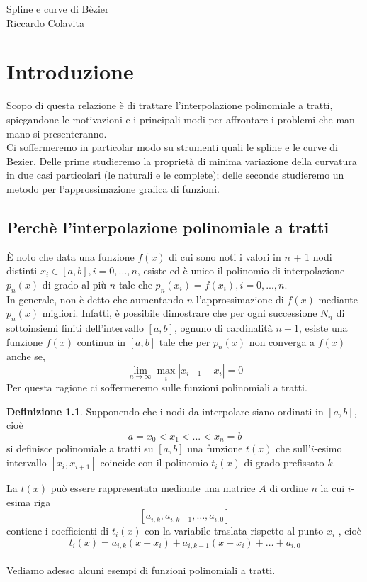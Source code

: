 \documentclass[a4paper,12pt]{report}
\theoremstyle{definition}
\newtheorem{defin}{Definizione}[chapter]
\begin{document}
\begin{center}
		{{\Huge Spline e curve di Bèzier}}\\
		\vspace{3cm}
		{{\Large Riccardo Colavita}}
\end{center}
	\tableofcontents
	\chapter{Introduzione}
Scopo di questa relazione è di trattare l'interpolazione polinomiale a tratti, spiegandone le motivazioni e i principali modi per affrontare i problemi che man mano si presenteranno.\\
Ci soffermeremo in particolar modo su strumenti quali le spline e le curve di Bezier. 
Delle prime studieremo la proprietà di minima variazione della curvatura in due casi particolari (le naturali e le complete); delle seconde studieremo un metodo per l'approssimazione grafica di funzioni.
\section{Perchè l'interpolazione polinomiale a tratti}
È noto che data una funzione $f(x)$ di cui sono noti i valori in $n$ + 1 nodi distinti
$x_i \in [a, b], i = 0, . . . , n$, esiste ed è unico il polinomio di interpolazione $p_n(x)$ di
grado al più $n$ tale che $p_n(x_i) = f(x_i), i = 0, . . . , n$.\\
In generale, non è detto che
aumentando $n$ l’approssimazione di $f(x)$ mediante $p_n (x)$ migliori. Infatti, è possibile dimostrare che per ogni successione $N_n$ di sottoinsiemi finiti dell'intervallo $[a,b]$, ognuno di cardinalità $n+1$, esiste una funzione $f(x)$ continua in $[a,b]$ tale che per $p_n(x)$ non converga a $f(x)$ anche se,
$$\lim_{ n \to \infty } \underset{i}{\max} |x_{i+1} - x_i | = 0$$ 
Per questa ragione ci soffermeremo sulle funzioni polinomiali a tratti.
\begin{defin}
    Supponendo che i nodi da interpolare siano ordinati in $[a,b]$, cioè $$a = x_0 < x_{1} < ... < x_{n} =  b$$
    si definisce polinomiale a tratti su $[a,b]$ una funzione $t(x)$ che sull'$i$-esimo intervallo $[x_i , x_{i+1}]$ coincide con il polinomio $t_i(x)$ di grado prefissato $k$.
\end{defin}
La $t(x)$ può essere rappresentata mediante una matrice $A$ di ordine $n$ la cui $i$-esima riga
$$[a_{i,k} , a_{i,k-1} , \ldots , a_{i,0}]$$
contiene i coefficienti di $t_i(x)$ con la variabile traslata rispetto al punto $x_i$ , cioè
$$t_i(x) = a_{i,k}(x-x_i) + a_{i,k-1}(x-x_i) + \ldots + a_{i,0}$$\\
Vediamo adesso alcuni esempi di funzioni polinomiali a tratti.
\end{document}
